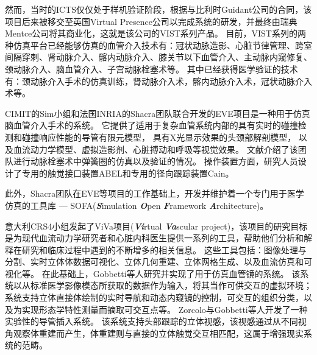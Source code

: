 然而，当时的ICTS仅仅处于样机验证阶段，根据与比利时Guidant公司的合同，该项目后来被移交至英国Virtual Presence公司以完成系统的研发，并最终由瑞典Mentce公司\cite{menticeweb}将其商业化\cite{GuidantMenticeNewsWeb}\cite{coles2011surveyCRaIVE}，这就是该公司的VIST系列产品。
目前，VIST系列的两种仿真平台已经能够仿真的血管介入技术有：冠状动脉造影、心脏节律管理、跨室间隔穿刺、肾动脉介入、髂内动脉介入、膝关节以下血管介入、主动脉内窥修复、颈动脉介入、脑血管介入、子宫动脉栓塞术等\cite{menticeweb}。
其中已经获得医学验证的技术有：颈动脉介入手术的仿真训练\cite{Dayal2004VIST}\cite{Hsu2004VIST}\cite{Nicholson2006VIST}\cite{Patel2006VIST}\cite{Cates2007VIST}\cite{VanHerzeele2009VIST}，肾动脉介入术\cite{Aggarwal2006}\cite{Glaiberman2008VIST}，髂内动脉介入术\cite{Chaer2006VIST}\cite{Berry2007VIST}\cite{VanHerzeele2008VIST}，冠状动脉介入术\cite{Gallagher2006VIST}等。

CIMIT的Sim小组\cite{medicalsimweb}和法国INRIA的Shacra团队\cite{shacraweb}联合开发的EVE项目\cite{Wu2005EVE}是一种用于仿真脑血管介入手术的系统。
它提供了适用于复杂血管系统内部的具有实时的碰撞检测和碰撞响应性能的导管有限元模型\cite{dequidt2007EVE}\cite{Duriez2006EVE}\cite{Lenoir2006EVE}\cite{Lenoir2005EVE}\cite{Cotin2005EVE}，
具有X光显示效果的头颈部解剖模型\cite{Wu2011EVE}\cite{Luboz2005EVE}\cite{Muniyandi2003EVE}，
以及血流动力学模型、虚拟造影剂、心脏搏动和呼吸\cite{Wu2007EVE}等视觉效果。
文献\cite{Dequidt2008EVE}介绍了该团队进行动脉栓塞术中弹簧圈的仿真以及验证的情况。
操作装置方面，研究人员设计了专用的触觉接口装置ABEL和专用的径向跟踪装置Cain\cite{medicalsimweb}。

此外，Shacra团队在EVE等项目的工作基础上，开发并维护着一个专门用于医学仿真的工具库 --- SOFA(\textbf{\textit{S}}imulation \textbf{\textit{O}}pen \textbf{\textit{F}}ramework \textbf{\textit{A}}rchitecture)\cite{Allard2007SOFA}。

意大利CRS4小组发起了ViVa项目(\textbf{\textit{Vi}}rtual \textbf{\textit{Va}}scular project)\cite{abdoulaev1998}，该项目的研究目标是为现代血流动力学研究者和心脏内科医生提供一系列的工具，帮助他们分析和解释在研究和临床过程中遇到的不断增多的相关信息。
这些工具包括：图像处理与分割、实时立体体数据可视化、立体几何重建、立体网格生成、以及血流仿真和可视化等。
在此基础上，Gobbetti等人\cite{Gobbetti1998}研究并实现了用于仿真血管镜的系统。
该系统以从标准医学影像模态所获取的数据作为输入，将其当作可供交互的虚拟环境；系统支持立体直接体绘制的实时导航和动态内窥镜的控制，可交互的组织分类，以及为实现形态学特性测量而摘取可交互点等。
Zorcolo与Gobbetti等人\cite{Zorcolo1999}\cite{Gobbetti2000}\cite{Zorcolo2000}开发了一种实验性的导管插入系统。
该系统支持头部跟踪的立体视感，该视感通过从不同视角观察体重建而产生，体重建则与直接的立体触觉交互相匹配，这属于增强现实系统的范畴。


